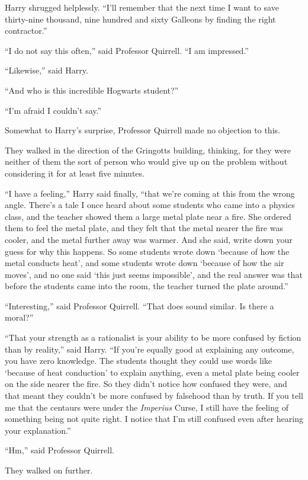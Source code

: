 Harry shrugged helplessly. ``I'll remember that the next time I want to
save thirty-nine thousand, nine hundred and sixty Galleons by finding
the right contractor.''

``I do not say this often,'' said Professor Quirrell. ``I am
impressed.''

``Likewise,'' said Harry.

``And who is this incredible Hogwarts student?''

``I'm afraid I couldn't say.''

Somewhat to Harry's surprise, Professor Quirrell made no objection to
this.

They walked in the direction of the Gringotts building, thinking, for
they were neither of them the sort of person who would give up on the
problem without considering it for at least five minutes.

``I have a feeling,'' Harry said finally, ``that we're coming at this
from the wrong angle. There's a tale I once heard about some students
who came into a physics class, and the teacher showed them a large metal
plate near a fire. She ordered them to feel the metal plate, and they
felt that the metal nearer the fire was cooler, and the metal further
away was warmer. And she said, write down your guess for why this
happens. So some students wrote down `because of how the metal conducts
heat', and some students wrote down `because of how the air moves', and
no one said `this just seems impossible', and the real answer was that
before the students came into the room, the teacher turned the plate
around.''

``Interesting,'' said Professor Quirrell. ``That does sound similar. Is
there a moral?''

``That your strength as a rationalist is your ability to be more
confused by fiction than by reality,'' said Harry. ``If you're equally
good at explaining any outcome, you have zero knowledge. The students
thought they could use words like `because of heat conduction' to
explain anything, even a metal plate being cooler on the side nearer the
fire. So they didn't notice how confused they were, and that meant they
couldn't be more confused by falsehood than by truth. If you tell me
that the centaurs were under the \emph{Imperius} Curse, I still have the
feeling of something being not quite right. I notice that I'm still
confused even after hearing your explanation.''

``Hm,'' said Professor Quirrell.

They walked on further.

